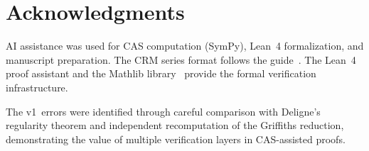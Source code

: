 \documentclass[11pt]{article}
\theoremstyle{plain}
\theoremstyle{definition}
\theoremstyle{remark}
\begin{document}
\section*{Acknowledgments}

AI assistance was used for CAS computation (SymPy), Lean~4 formalization,
and manuscript preparation. The CRM series format follows the
guide~\cite{FormatGuide}. The Lean~4 proof assistant and the Mathlib
library~\cite{Mathlib} provide the formal verification infrastructure.

The v1~errors were identified through careful comparison with Deligne's
regularity theorem and independent recomputation of the Griffiths
reduction, demonstrating the value of multiple verification layers in
CAS-assisted proofs.
\end{document}
